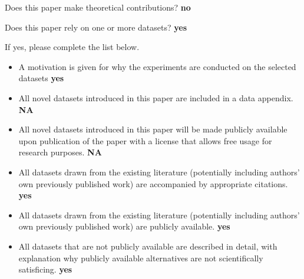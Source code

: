 Does this paper make theoretical contributions? \textbf{no}

Does this paper rely on one or more datasets? \textbf{yes}

If yes, please complete the list below.
\begin{itemize}
    \item A motivation is given for why the experiments are conducted on the selected datasets \textbf{yes}
    \item All novel datasets introduced in this paper are included in a data appendix. \textbf{NA}
    \item All novel datasets introduced in this paper will be made publicly available upon publication of the paper with a license that allows free usage for research purposes. \textbf{NA}
    \item All datasets drawn from the existing literature (potentially including authors’ own previously published work) are accompanied by appropriate citations. \textbf{yes}
    \item All datasets drawn from the existing literature (potentially including authors’ own previously published work) are publicly available. \textbf{yes}
    \item All datasets that are not publicly available are described in detail, with explanation why publicly available alternatives are not scientifically satisficing. \textbf{yes}
\end{itemize}

